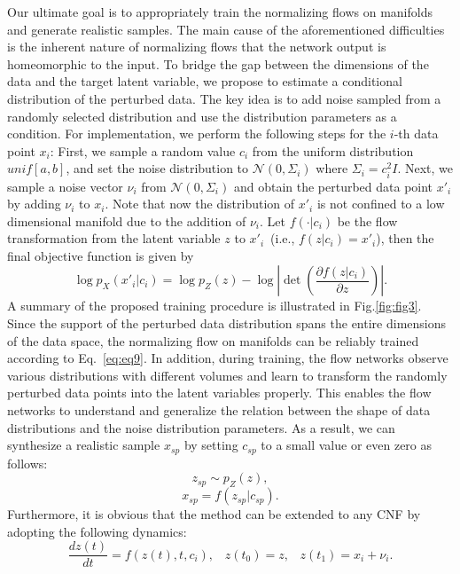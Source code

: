 \documentclass{article}
\begin{document}
Our ultimate goal is to appropriately train the normalizing flows on manifolds and generate realistic samples. The main cause of the aforementioned difficulties is the inherent nature of normalizing flows that the network output is homeomorphic to the input. To bridge the gap between the dimensions of the data and the target latent variable, we propose to estimate a conditional distribution of the perturbed data. The key idea is to add noise sampled from a randomly selected distribution and use the distribution parameters as a condition. For implementation, we perform the following steps for the $i$-th data point $x_{i}$: First, we sample a random value $c_{i}$ from the uniform distribution $unif[a,b]$, and set the noise distribution to $\mathcal{N}({0}, {\Sigma}_{i})$ where ${\Sigma}_{i}=c^{2}_{i}{I}$. Next, we sample a noise vector ${{\nu}_{i}}$ from $\mathcal{N}({0}, {\Sigma}_{i})$ and obtain the perturbed data point ${x}'_{i}$ by adding ${\nu}_{i}$ to ${x}_{i}$. Note that now the distribution of ${x}'_{i}$ is not confined to a low dimensional manifold due to the addition of ${\nu}_{i}$. Let ${f}(\cdot|{c}_{i})$ be the flow transformation from the latent variable ${z}$ to ${x}'_{i}$~(i.e., ${f}({z}|{c}_{i})={x}'_{i}$), then the final objective function is given by
\begin{equation}
\label{eq:eq9}
\log p_{X}({x}'_{i}|{c}_{i}) = \log p_{Z}({z}) - \log\left|\det\left(\frac{\partial {f}({z}|{c}_{i})}{\partial{z}}\right)\right|.
\end{equation}
A summary of the proposed training procedure is illustrated in Fig.\ref{fig:fig3}. Since the support of the perturbed data distribution spans the entire dimensions of the data space, the normalizing flow on manifolds can be reliably trained according to Eq.~\eqref{eq:eq9}. In addition, during training, the flow networks observe various distributions with different volumes and learn to transform the randomly perturbed data points into the latent variables properly. This enables the flow networks to understand and generalize the relation between the shape of data distributions and the noise distribution parameters. As a result, we can synthesize a realistic sample ${x}_{sp}$ by setting $c_{sp}$ to a small value or even zero as follows:
\begin{equation}
\label{eq:eq10}
{z}_{sp} \sim p_{Z}({z}),
\end{equation}
\begin{equation}
\label{eq:eq11}
{x}_{sp} = {f}({z}_{sp}|{c}_{sp}).
\end{equation}
Furthermore, it is obvious that the method can be extended to any CNF by adopting the following dynamics:
\begin{equation}
\label{eq:eq12}
\frac{d{z}(t)}{dt} = {f}({z}(t), t, {c}_{i}), \;\;\; {z}(t_{0}) = {z}, \;\;\; {z}(t_{1}) = {x}_{i} + {\nu}_{i}.
\end{equation}
\end{document}
